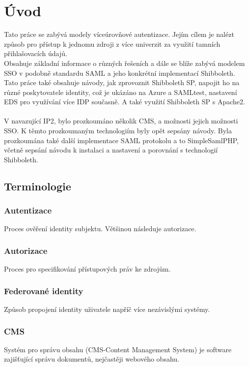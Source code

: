 \chapter{Úvod}
Tato práce se zabývá modely víceúrovňové autentizace. Jejím cílem je nalézt způsob pro přístup k jednomu zdroji z více univerzit za využití tamních přihlašovacích údajů.\\
Obsahuje základní informace o různých řešeních a dále se blíže zabývá modelem SSO v podobně standardu SAML a jeho konkrétní implementací Shibboleth.\\
Tato práce také obsahuje návody, jak zprovoznit Shibboleth SP, napojit ho na různé poskytovatele identity, což je ukázáno na Azure a SAMLtest, nastavení EDS pro využívání více IDP současně. A také využití Shibboleth SP s Apache2.\\
\\%
V navazující IP2, bylo prozkoumáno několik CMS, a možnosti jejich možnosti SSO. K těmto prozkoumaným technologiím byly opět sepsány návody. Byla prozkoumána také další implementace SAML protokolu a to SimpleSamlPHP, včetně sepsání návodu k instalaci a nastavení a porovnání s technologií Shibboleth.



\section{Terminologie}
\subsection{Autentizace}
Proces ověření identity subjektu. Většinou následuje autorizace.\cite{Authorization}
\subsection{Autorizace}
Proces pro specifikování přístupových práv ke zdrojům.\cite{Autentizace}
 \subsection{Federované identity}
Způsob propojení identity uživatele napříč více nezávislými systémy. \cite{federatedIdentities}
\subsection{CMS} %
Systém pro správu obsahu (CMS-Content Management System) je software zajišťující správu dokumentů, nejčastěji webového obsahu.\cite{cms}

